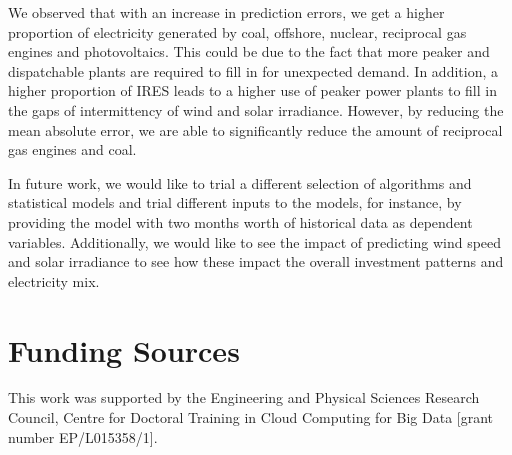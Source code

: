 \documentclass[final,3p,times,twocolumn,numbers]{elsarticle}
\begin{document}
We observed that with an increase in prediction errors, we get a higher proportion of electricity generated by coal, offshore, nuclear, reciprocal gas engines and photovoltaics. This could be due to the fact that more peaker and dispatchable plants are required to fill in for unexpected demand. In addition, a higher proportion of IRES leads to a higher use of peaker power plants to fill in the gaps of intermittency of wind and solar irradiance. However, by reducing the mean absolute error, we are able to significantly reduce the amount of reciprocal gas engines and coal.

In future work, we would like to trial a different selection of algorithms and statistical models and trial different inputs to the models, for instance, by providing the model with two months worth of historical data as dependent variables. Additionally, we would like to see the impact of predicting wind speed and solar irradiance to see how these impact the overall investment patterns and electricity mix. 


\section{Funding Sources}

This work was supported by the Engineering and Physical Sciences Research Council, Centre for Doctoral Training in Cloud Computing for Big Data [grant number EP/L015358/1].







   
  


%
%
%
\end{document}
